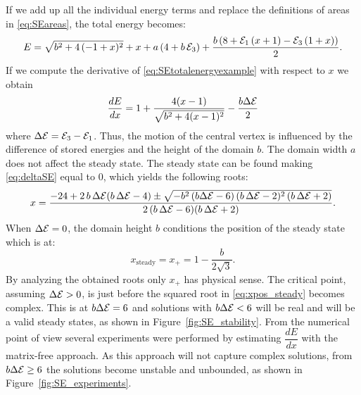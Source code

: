 %
If we add up all the individual energy terms and replace the definitions of areas in \eqref{eq:SEareas}, the total energy becomes:
\begin{equation}
    E = \sqrt{b^2 + 4\,(-1 + x)^2} + x + a\, (4 + b\,\mathcal{E}_3) + 
 \frac{b\,(8 + \mathcal{E}_1\,(x+1) - \mathcal{E}_3\,(1 + x))}{2}.
    \label{eq:SEtotalenergyexample}
\end{equation}
If we compute the derivative of \eqref{eq:SEtotalenergyexample} with respect to $x$ we obtain
\begin{equation}
    \frac{dE}{dx} = 1 + \frac{4 (x-1)}{\sqrt{b^2 + 4 (x-1)^2}} - \frac{b \Delta \mathcal{E}}{2}
    \label{eq:deltaSE}
\end{equation}
%
where $\Delta \mathcal{E} = \mathcal{E}_3 - \mathcal{E}_1$. 
Thus, the motion of the central vertex is influenced by the difference of stored energies and the height of the domain $b$. 
The domain width $a$ does not affect the steady state. 
The steady state can be found making \eqref{eq:deltaSE} equal to 0, which yields the following roots:
\begin{equation}
    x=\frac{ -24 + 2\, b\, \Delta \mathcal{E}  (b \,\Delta \mathcal{E} -4) \pm \sqrt{-b^2 \,(b \Delta \mathcal{E} -6)\, (b \,\Delta \mathcal{E} -2)^2\, (b\, \Delta \mathcal{E} +2)}}{2 \,(b\, \Delta \mathcal{E} -6) (b\, \Delta \mathcal{E} +2)}.
    \label{eq:xpos_steady}
\end{equation}
When $\Delta \mathcal{E} = 0$, the domain height $b$ conditions the position of the steady state which is at:
\begin{equation*}
    x_{\text{steady}} = x_+ = 1 - \frac{b}{2\sqrt{3}}.
\end{equation*}
By analyzing the obtained roots only $x_+$ has physical sense.
The critical point, assuming $\Delta \mathcal{E} > 0$, is just before 
the squared root in \eqref{eq:xpos_steady} becomes complex. 
This is at $b\Delta \mathcal{E} = 6$ and solutions with $b \Delta \mathcal{E} < 6$ will be real and will be a valid steady states, as shown in Figure~\ref{fig:SE_stability}. 
From the numerical point of view several experiments were performed by estimating $\dfrac{dE}{dx}$ with the matrix-free approach. 
As this approach will not capture complex solutions, from $b\Delta \mathcal{E} \geq 6$ the solutions become unstable and unbounded, as shown in Figure~\ref{fig:SE_experiments}.

